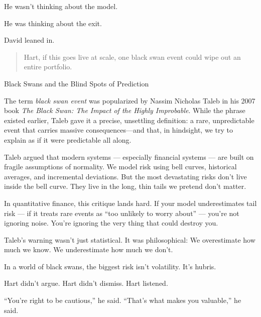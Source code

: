 He wasn’t thinking about the model.

He was thinking about the exit.

David leaned in.

\begin{quote}
Hart, if this goes live at scale, one black swan event could wipe out an 
entire portfolio.
\end{quote}

\medskip

\begin{HistoricalSidebar}{Black Swans and the Blind Spots of Prediction}

  The term \textit{black swan event} was popularized by Nassim Nicholas Taleb in his 2007 book \textit{The Black Swan: 
  The Impact of the Highly Improbable}. While the phrase existed earlier, Taleb gave it a precise, unsettling definition: 
  a rare, unpredictable event that carries massive consequences—and that, in hindsight, we try to explain as if it 
  were predictable all along.

  \medskip
  
  Taleb argued that modern systems --- especially financial systems --- are built on fragile assumptions of normality. We model 
  risk using bell curves, historical averages, and incremental deviations. But the most devastating risks don’t live 
  inside the bell curve. They live in the long, thin tails we pretend don’t matter.
  
  \medskip
  
  In quantitative finance, this critique lands hard. If your model underestimates tail risk --- if it treats rare events 
  as “too unlikely to worry about” --- you’re not ignoring noise. You’re ignoring the very thing that could destroy you.

  \medskip
  
  Taleb’s warning wasn’t just statistical. It was philosophical:  
  We overestimate how much we know.  
  We underestimate how much we don’t.

  \medskip
  
  In a world of black swans, the biggest risk isn’t volatility.  
  It’s hubris.
  
\end{HistoricalSidebar}

\medskip


Hart didn’t argue. Hart didn’t dismiss.  Hart listened.

``You’re right to be cautious,'' he said.  
``That’s what makes you valuable,'' he said.

